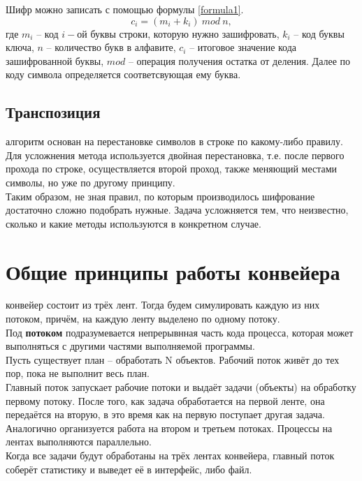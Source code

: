 Шифр можно записать с помощью формулы \ref{formula1}.
\begin{equation}\label{formula1}
	c_i = (m_i + k_i)\:mod\:n,
\end{equation}
где $m_i$ -- код $i-$ой буквы строки, которую нужно зашифровать, $k_i$ -- код буквы ключа, $n$ -- количество букв в алфавите, $c_i$ -- итоговое значение кода зашифрованной буквы, $mod$ -- операция получения остатка от деления. Далее по коду символа определяется соответсвующая ему буква. \cite{cript}

\subsection{Транспозиция}
 алгоритм основан на перестановке символов в строке по какому-либо правилу. Для усложнения метода используется двойная перестановка, т.е. после первого прохода по строке, осуществляется второй проход, также меняющий местами символы, но уже по другому принципу.\\

Таким образом, не зная правил, по которым производилось шифрование достаточно сложно подобрать нужные. Задача усложняется тем, что неизвестно, сколько и какие методы используются в конкретном случае. \cite{cript2}

\section{Общие принципы работы конвейера}
 конвейер состоит из трёх лент. Тогда будем симулировать каждую из них потоком, причём, на каждую ленту выделено по одному потоку.\\

Под \textbf{потоком} подразумевается непрерывнная часть кода процесса, которая может выполняться с другими частями выполняемой программы.\\

Пусть существует план -- обработать N объектов. Рабочий поток живёт до тех пор, пока не выполнит весь план.\\

Главный поток запускает рабочие потоки и выдаёт задачи (объекты) на обработку первому потоку. После того, как задача обработается на первой ленте, она передаётся на вторую, в это время как на первую поступает другая задача. Аналогично организуется работа на втором и третьем потоках. Процессы на лентах выполняются параллельно.\\

Когда все задачи будут обработаны на трёх лентах конвейера, главный поток соберёт статистику и выведет её в интерфейс, либо файл.\\

